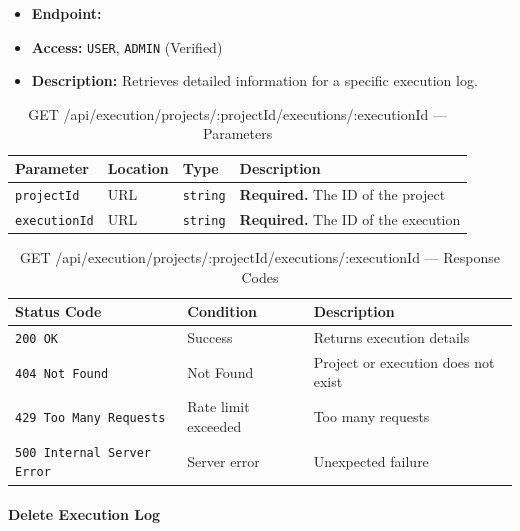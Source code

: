 \begin{itemize}
  \item \textbf{Endpoint:} \texttt{}
  \item \textbf{Access:} \texttt{USER}, \texttt{ADMIN} (Verified)
  \item \textbf{Description:} Retrieves detailed information for a specific execution log.
\end{itemize}

\begin{table}[H]
\centering
\renewcommand{\arraystretch}{1.3}
\begin{tabularx}{\textwidth}{|l|l|l|X|}
\hline
\textbf{Parameter} & \textbf{Location} & \textbf{Type} & \textbf{Description} \\
\hline
\texttt{projectId}   & URL & \texttt{string} & \textbf{Required.} The ID of the project \\
\hline
\texttt{executionId} & URL & \texttt{string} & \textbf{Required.} The ID of the execution \\
\hline
\end{tabularx}
\caption{GET /api/execution/projects/:projectId/executions/:executionId — Parameters}
\label{tab:get-execution-by-id-params}
\end{table}

\begin{table}[H]
\centering
\renewcommand{\arraystretch}{1.3}
\begin{tabularx}{\textwidth}{|l|l|X|}
\hline
\textbf{Status Code} & \textbf{Condition} & \textbf{Description} \\
\hline
\texttt{200 OK}           & Success            & Returns execution details \\
\hline
\texttt{404 Not Found}    & Not Found          & Project or execution does not exist \\
\hline
\texttt{429 Too Many Requests} & Rate limit exceeded & Too many requests \\
\hline
\texttt{500 Internal Server Error} & Server error & Unexpected failure \\
\hline
\end{tabularx}
\caption{GET /api/execution/projects/:projectId/executions/:executionId — Response Codes}
\label{tab:get-execution-by-id-responses}
\end{table}
\FloatBarrier

\paragraph{Delete Execution Log}
\label{subsubsec:delete-execution-log}

